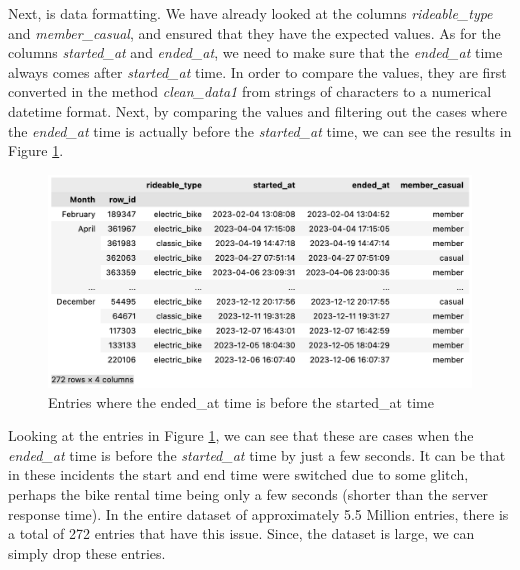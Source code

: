 \documentclass[12pt]{article}
\begin{document}
\begin{itemize}
Next, is data formatting. We have already looked at the columns \textit{rideable\_type} and \textit{member\_casual}, and ensured that they have the expected values. As for the columns \textit{started\_at} and \textit{ended\_at}, we need to make sure that the \textit{ended\_at} time always comes after \textit{started\_at} time. In order to compare the values, they are first converted in the method \textit{clean\_data1} from strings of characters to a numerical datetime format. Next, by comparing the values and filtering out the cases where the \textit{ended\_at} time is actually before the \textit{started\_at} time, we can see the results in Figure \ref{fig8}.

	\begin{figure}[h]
	\centering
	\includegraphics[scale=0.6]{imgNEG.png}
	\caption{Entries where the ended\_at time is before the started\_at time}
	\label{fig8}
	\end{figure}

Looking at the entries in Figure \ref{fig8}, we can see that these are cases when the \textit{ended\_at} time is before the \textit{started\_at} time by just a few seconds. It can be that in these incidents the start and end time were switched due to some glitch, perhaps the bike rental time being only a few seconds (shorter than the server response time). In the entire dataset of approximately 5.5 Million entries, there is a total of 272 entries that have this issue. Since, the dataset is large, we can simply drop these entries.
	
	\end{itemize}

\pagebreak
	
\end{document}
